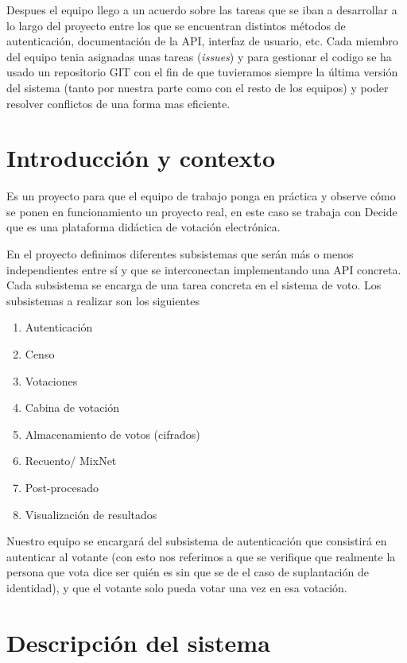 \documentclass[12pt]{article}
\begin{document}
Despues el equipo llego a un acuerdo sobre las tareas que se iban a desarrollar a lo largo del proyecto entre los que se encuentran distintos métodos de autenticación, documentación de la API, interfaz de usuario, etc. Cada miembro del equipo tenia asignadas unas tareas (\emph{issues}) y para gestionar el codigo se ha usado un repositorio GIT con el fin de que tuvieramos siempre la última versión del sistema (tanto por nuestra parte como con el resto de los equipos) y poder resolver conflictos de una forma mas eficiente.



\newpage	
\section{Introducción y contexto}

Es un proyecto para que el equipo de trabajo ponga en práctica y observe cómo se ponen en funcionamiento un proyecto real, en este caso se trabaja con Decide que es una plataforma didáctica de votación electrónica.

En el proyecto definimos diferentes subsistemas que serán más o menos independientes entre sí y que se interconectan implementando una API concreta.
Cada subsistema se encarga de una tarea concreta en el sistema de voto. Los subsistemas a realizar son los siguientes \cite{decide-subsistemas}

 \begin{enumerate}
    \item Autenticación
    \item Censo
    \item Votaciones
    \item Cabina de votación
    \item Almacenamiento de votos (cifrados)
    \item Recuento/ MixNet
    \item Post-procesado
    \item Visualización de resultados
 \end{enumerate}

Nuestro equipo se encargará del subsistema de autenticación que consistirá en autenticar al votante (con esto nos referimos a que se verifique que realmente la persona que vota dice ser quién es sin que se de el caso de suplantación de identidad), y que el votante solo pueda votar una vez en esa votación.

\section{Descripción del sistema}
\end{document}
